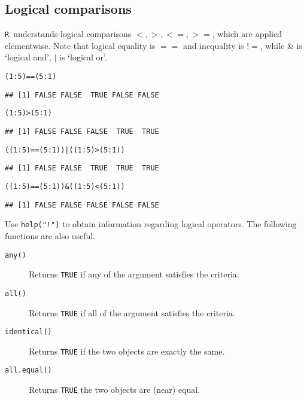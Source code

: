 \documentclass[12pt,A4,makeidx]{article}\usepackage[]{graphicx}\usepackage[]{xcolor}
\makeatletter
\newcommand{\hlnum}[1]{\textcolor[rgb]{0.686,0.059,0.569}{#1}}%
\newcommand{\hlopt}[1]{\textcolor[rgb]{0,0,0}{#1}}%
\newcommand{\hlstd}[1]{\textcolor[rgb]{0.345,0.345,0.345}{#1}}%
\newenvironment{kframe}{%
 \def\at@end@of@kframe{}%
 \ifinner\ifhmode%
  \def\at@end@of@kframe{\end{minipage}}%
  \begin{minipage}{\columnwidth}%
 \fi\fi%
 \def\FrameCommand##1{\hskip\@totalleftmargin \hskip-\fboxsep
 \colorbox{shadecolor}{##1}\hskip-\fboxsep
     \hskip-\linewidth \hskip-\@totalleftmargin \hskip\columnwidth}%
 \MakeFramed {\advance\hsize-\width
   \@totalleftmargin\z@ \linewidth\hsize
   \@setminipage}}%
 {\par\unskip\endMakeFramed%
 \at@end@of@kframe}
\newenvironment{knitrout}{}{} %
\newcommand{\tR}{\texttt{R}}
\makeatother
\begin{document}
\subsection{Logical comparisons}
\tR\ understands logical comparisons $<,>,<=,>=$, which are applied elementwise. Note that logical equality is
$==$ and inequality is $!=$, while \& is `logical and', $\mid$ is `logical or'.
\begin{knitrout}
\color{fgcolor}\begin{kframe}
\begin{alltt}
\hlstd{(}\hlnum{1}\hlopt{:}\hlnum{5}\hlstd{)} \hlopt{==} \hlstd{(}\hlnum{5}\hlopt{:}\hlnum{1}\hlstd{)}
\end{alltt}
\begin{verbatim}
## [1] FALSE FALSE  TRUE FALSE FALSE
\end{verbatim}
\begin{alltt}
\hlstd{(}\hlnum{1}\hlopt{:}\hlnum{5}\hlstd{)}\hlopt{>}\hlstd{(}\hlnum{5}\hlopt{:}\hlnum{1}\hlstd{)}
\end{alltt}
\begin{verbatim}
## [1] FALSE FALSE FALSE  TRUE  TRUE
\end{verbatim}
\begin{alltt}
\hlstd{((}\hlnum{1}\hlopt{:}\hlnum{5}\hlstd{)}\hlopt{==}\hlstd{(}\hlnum{5}\hlopt{:}\hlnum{1}\hlstd{))}\hlopt{|}\hlstd{((}\hlnum{1}\hlopt{:}\hlnum{5}\hlstd{)}\hlopt{>}\hlstd{(}\hlnum{5}\hlopt{:}\hlnum{1}\hlstd{))}
\end{alltt}
\begin{verbatim}
## [1] FALSE FALSE  TRUE  TRUE  TRUE
\end{verbatim}
\begin{alltt}
\hlstd{((}\hlnum{1}\hlopt{:}\hlnum{5}\hlstd{)}\hlopt{==}\hlstd{(}\hlnum{5}\hlopt{:}\hlnum{1}\hlstd{))}\hlopt{&} \hlstd{((}\hlnum{1}\hlopt{:}\hlnum{5}\hlstd{)}\hlopt{<}\hlstd{(}\hlnum{5}\hlopt{:}\hlnum{1}\hlstd{))}
\end{alltt}
\begin{verbatim}
## [1] FALSE FALSE FALSE FALSE FALSE
\end{verbatim}
\end{kframe}
\end{knitrout}

Use \texttt{help("!")} to obtain information regarding logical operators. The following functions are also useful.
\begin{description}
\item[\texttt{any()}] Returns \texttt{TRUE} if any of the argument satisfies the criteria.
\item[\texttt{all()}] Returns \texttt{TRUE} if all of the argument satisfies the criteria.
\item[\texttt{identical()}] Returns \texttt{TRUE} if the two objects are exactly the same.
\item[\texttt{all.equal()}] Returns \texttt{TRUE} the two objects are (near) equal.
\end{description}
\end{document}
